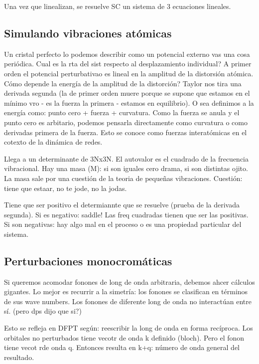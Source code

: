   Una vez que linealizan, se resuelve SC un sistema de 3 ecuaciones lineales.

\subsection{Simulando vibraciones atómicas}

  Un cristal perfecto lo podemos describir como un potencial externo vas una cosa periódica. Cual es la rta del sist respecto al desplazamiento individual? A primer orden el potencial perturbativao  es lineal en la amplitud de la distorsión atómica. Cómo depende la energía de la amplitud de la distorción? Taylor nos tira una derivada segunda (la de primer orden muere porque se supone que estamos en el mínimo vro - es la fuerza la primera - estamos en equilibrio). O sea definimos a la energía como: punto cero + fuerza + curvatura. Como la fuerza se anula y el punto cero es arbitario, podemos pensarla directamente como curvatura o como derivadas primera de la fuerza. Esto se conoce como fuerzas interatómicas en el cotexto de la dinámica de redes.

  Llega a un determinante de 3Nx3N. El autovalor es el cuadrado de la frecuencia vibracional. Hay una masa (M): si son iguales cero drama, si son distintas ojito. La masa sale por una cuestión de la teoria de pequeñas vibraciones. Cuestión: tiene que estaar, no te jode, no la jodas.

  Tiene que ser positivo el determiannte que se resuelve (prueba de la derivada segunda). Si es negativo: saddle! Las freq cuadradas tienen que ser las positivas. Si son negativas: hay algo mal en el proceso o es una propiedad particular del sistema.

\subsection{Perturbaciones monocromáticas}

  Si queremos acomodar fonones de long de onda arbitraria, debemos ahcer cálculos gigantes. Lo mejor es recurrir a la simetría: los fonones se clasifican en términos de sus wave numbers. Los fonones de diferente long de onda no interactúan entre sí. (pero dps dijo que si?)

  Esto se refleja en DFPT según: reescribir la long de onda en forma recíproca. Los orbitales no perturbados tiene vecotr de onda k definido (bloch). Pero el fonon tiene vecot rde onda q. Entonces resulta en k+q: número de onda general del resultado.

